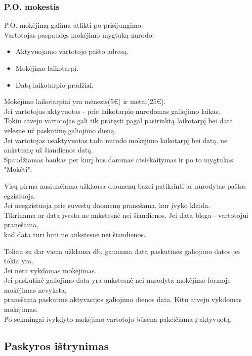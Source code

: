 \documentclass[a4paper,12pt]{article}
\begin{document}
\subsubsection{P.O. mokestis}
P.O. mokėjimą galima atlikti po prisijungimo. \\
Vartotojas paspaudęs mokėjimo mygtuką nurodo:
\begin{itemize}
	\item Aktyvuojamo vartotojo pašto adresą.
	\item Mokėjimo laikotarpį.
	\item Datą laikotarpio pradžiai.
\end{itemize} 
Mokėjimo laikotarpiai yra mėnesis(5€) ir metai(25€). \\
Jei vartotojas aktyvuotas - prie laikotarpio nurodomas galiojimo laikas.\\
Tokiu atveju vartotojas gali tik pratęsti pagal pasirinktą laikotarpį 
bei data vėlesne už paskutinę galiojimo dieną.\\
Jei vartotojas neaktyvuotas tada nurodo mokėjimo laikotarpį bei datą,
ne ankstesnę už šiandienos datą. \\
Spaudžiamas bankas per kurį bus daromas atsiskaitymas ir po to mygtukas "Mokėti".


Visų pirma nusiunčiama užklausa duomenų bazei patikrinti ar nurodytas paštas egzistuoja. \\
Jei neegzistuoja prie suvestų duomenų pranešama, kur įvyko klaida.\\

Tikrinama ar data įvesta ne ankstesnė nei šiandienos. Jei data bloga - vartotojui pranešama, \\
kad data turi būti ne ankstesnė nei šiandienos.

Toliau su dar viena užklausa db. gaunama data paskutinės galiojimo datos jei tokia yra. \\
Jei nėra vykdomas mokėjimas. \\
Jei paskutinė galiojimo data yra ankstesnė nei nurodyta mokėjimo formoje mokėjimas nevyksta, \\
pranešama paskutinė aktyvacijos galiojimo dienos data. Kitu atveju vykdomas mokėjimas. \\

Po sekmingai ivykdyto mokėjimo vartotojo būsena pakeičiama į aktyvuotą.
  


\subsection{ Paskyros ištrynimas }
\end{document}
